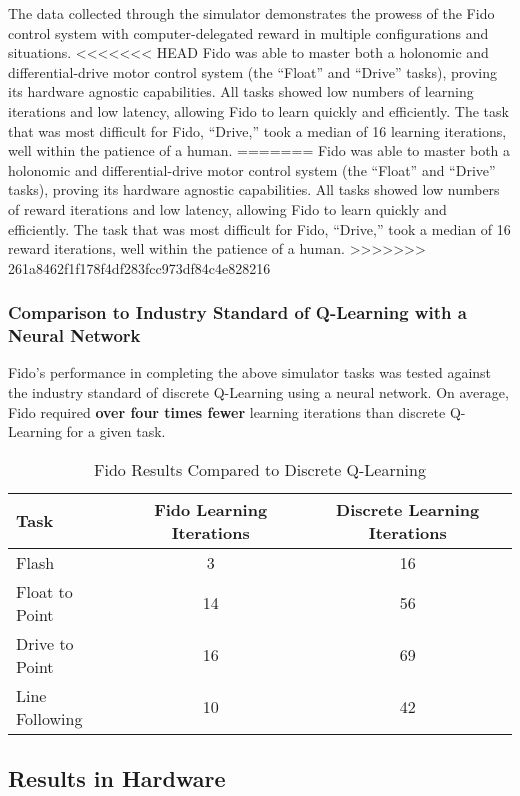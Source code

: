 The data collected through the simulator demonstrates the prowess of the Fido control system with computer-delegated reward in multiple configurations and situations.
<<<<<<< HEAD
 Fido was able to master both a holonomic and differential-drive motor control system (the ``Float'' and ``Drive'' tasks), proving its hardware agnostic capabilities.
All tasks showed low numbers of learning iterations and low latency, allowing Fido to learn quickly and efficiently.
The task that was most difficult for Fido, ``Drive,'' took a median of 16 learning iterations, well within the patience of a human.
=======
Fido was able to master both a holonomic and differential-drive motor control system (the ``Float'' and ``Drive'' tasks), proving its hardware agnostic capabilities.
All tasks showed low numbers of reward iterations and low latency, allowing Fido to learn quickly and efficiently.
The task that was most difficult for Fido, ``Drive,'' took a median of 16 reward iterations, well within the patience of a human.
>>>>>>> 261a8462f1f178f4df283fcc973df84c4e828216

\subsubsection{Comparison to Industry Standard of Q-Learning with a Neural Network}

Fido's performance in completing the above simulator tasks was tested against the industry standard of discrete Q-Learning using a neural network.  On average, Fido required \textbf{over four times fewer} learning iterations than discrete Q-Learning for a given task.

\begin{table}[ht]
	\centering
	\begin{tabular}{lcc}
		\toprule
		Task       		  & Fido Learning Iterations & Discrete Learning Iterations \\ \midrule
		Flash             & 3   & 16  \\
		Float to Point    & 14  & 56  \\
		Drive to Point    & 16  & 69  \\
		Line Following    & 10  & 42 \\ \bottomrule
	\end{tabular}
	\caption {Fido Results Compared to Discrete Q-Learning}
	\label{tab:simindustrystandardresults}
\end{table}

\subsection{Results in Hardware}

